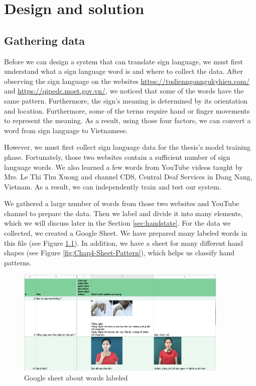 \chapter{Design and solution}
\section{Gathering data}



Before we can design a system that can translate sign language, we must first understand what a sign language word is and where to collect the data. After observing the sign language on the websites \url{https://tudienngonngukyhieu.com/} and \url{https://qipedc.moet.gov.vn/}, we noticed that some of the words have the same pattern. Furthermore, the sign's meaning is determined by its orientation and location. Furthermore, some of the terms require hand or finger movements to represent the meaning. As a result, using those four factors, we can convert a word from sign language to Vietnamese.

However, we must first collect sign language data for the thesis's model training phase. Fortunately, those two websites contain a sufficient number of sign language words. We also learned a few words from YouTube videos taught by Mrs. Le Thi Thu Xuong\cite{yt:LeThiThuXuong} and channel CDS, Central Deaf Services in Dang Nang, Vietnam\cite{yt:CDS}. As a result, we can independently train and test our system.

We gathered a large number of words from those two websites and YouTube channel to prepare the data. Then we label and divide it into many elements, which we will discuss later in the Section \ref{sec:handstate}. For the data we collected, we created a Google Sheet. We have prepared many labeled words in this file (see Figure \ref{fig:Chap4-Label-Word}). In addition, we have a sheet for many different hand shapes (see Figure \ref{fig:Chap4-Sheet-Pattern}), which helps us classify hand patterns.

\begin{figure}[H]
	\centering
	\includegraphics[width=0.9\textwidth]{img/Chap4/Label-Word.jpg}
	\caption{Google sheet about words labeled}
	\label{fig:Chap4-Label-Word}
\end{figure}

